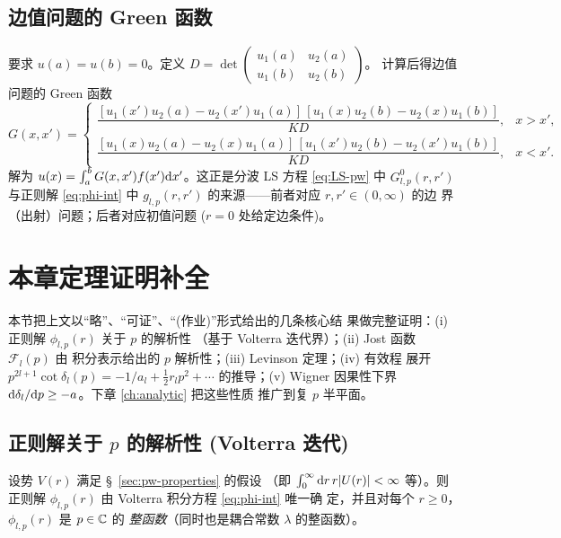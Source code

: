 \subsection*{边值问题的 Green 函数}

要求 $u(a)=u(b)=0$。定义
$D=\det\begin{pmatrix}u_1(a)& u_2(a)\\ u_1(b)& u_2(b)\end{pmatrix}$。
计算后得边值问题的 Green 函数
\begin{equation}\label{eq:Green-BVP}
G(x,x')=\begin{cases}
\dfrac{[u_1(x')u_2(a)-u_2(x')u_1(a)]\,[u_1(x)u_2(b)-u_2(x)u_1(b)]}{KD},&
   x>x',\\[4pt]
\dfrac{[u_1(x)u_2(a)-u_2(x)u_1(a)]\,[u_1(x')u_2(b)-u_2(x')u_1(b)]}{KD},&
   x<x'.
\end{cases}
\end{equation}
解为 $u(x)=\int_a^b G(x,x')f(x')\mathrm{d} x'$。这正是分波 LS 方程
\eqref{eq:LS-pw} 中 $G_{l,p}^{0}(r,r')$ 与正则解 \eqref{eq:phi-int}
中 $g_{l,p}(r,r')$ 的来源——前者对应 $r,r'\in(0,\infty)$ 的边
界（出射）问题；后者对应初值问题 ($r=0$ 处给定边条件)。

\section{本章定理证明补全}\label{sec:pw-proofs}

本节把上文以“略”、“可证”、“(作业)”形式给出的几条核心结
果做完整证明：(i) 正则解 $\phi_{l,p}(r)$ 关于 $p$ 的解析性
（基于 Volterra 迭代界）；(ii) Jost 函数 $\mathcal F_l(p)$ 由
积分表示给出的 $p$ 解析性；(iii) Levinson 定理；(iv) 有效程
展开 $p^{2l+1}\cot\delta_l(p)=-1/a_l+\tfrac12 r_l p^2+\cdots$
的推导；(v) Wigner 因果性下界
$\mathrm{d}\delta_l/\mathrm{d} p\ge -a$。下章 \ref{ch:analytic} 把这些性质
推广到复 $p$ 半平面。

\subsection{正则解关于 $p$ 的解析性 (Volterra 迭代)}\label{sec:pw-regular-analytic}

\begin{theorem}[正则解的整函数性质]\label{thm:pw-regular-entire}
设势 $V(r)$ 满足 \S~\ref{sec:pw-properties} 的假设
（即 $\int_0^\infty\mathrm{d} r\,r|U(r)|<\infty$ 等）。则正则解
$\phi_{l,p}(r)$ 由 Volterra 积分方程 \eqref{eq:phi-int} 唯一确
定，并且对每个 $r\ge 0$，$\phi_{l,p}(r)$ 是 $p\in\mathbb{C}$ 的
\emph{整函数}（同时也是耦合常数 $\lambda$ 的整函数）。
\end{theorem}

